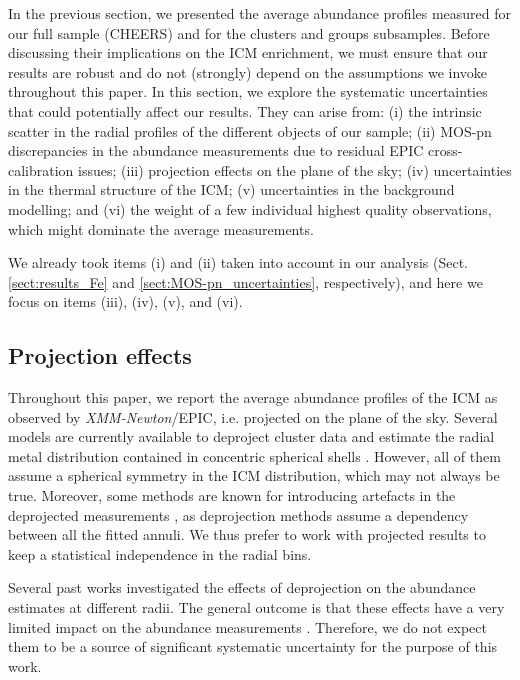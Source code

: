 \documentclass{aa}
\begin{document}
In the previous section, we presented the average abundance profiles measured for our full sample (CHEERS) and for the clusters and groups subsamples. Before discussing their implications on the ICM enrichment, we must ensure that our results are robust and do not (strongly) depend on the assumptions we invoke throughout this paper.
In this section, we explore the systematic uncertainties that could potentially affect our results. They can arise from: (i) the intrinsic scatter in the radial profiles of the different objects of our sample; (ii) MOS-pn discrepancies in the abundance measurements due to residual EPIC cross-calibration issues; (iii) projection effects on the plane of the sky; (iv) uncertainties in the thermal structure of the ICM; (v) uncertainties in the background modelling; and (vi) the weight of a few individual highest quality observations, which might dominate the average measurements.

We already took items (i) and (ii) taken into account in our analysis (Sect. \ref{sect:results_Fe} and \ref{sect:MOS-pn_uncertainties}, respectively), and here we focus on items (iii), (iv), (v), and (vi).









\subsection{Projection effects}\label{sect:systematics_proj}


Throughout this paper, we report the average abundance profiles of the ICM as observed by \textit{XMM-Newton}/EPIC, i.e. projected on the plane of the sky. Several models are currently available to deproject cluster data and estimate the radial metal distribution contained in concentric spherical shells \citep[e.g.][]{2003ApJ...590..225C,2004A&A...413..415K,2005MNRAS.356..237J,2008MNRAS.390.1207R}. However, all of them assume a spherical symmetry in the ICM distribution, which may not always be true. Moreover, some methods are known for introducing artefacts in the deprojected measurements \citep[for a comparison, see][]{2008MNRAS.390.1207R}, as deprojection methods assume a dependency between all the fitted annuli. We thus prefer to work with projected results to keep a statistical independence in the radial bins.

Several past works investigated the effects of deprojection on the abundance estimates at different radii. The general outcome is that these effects have a very limited impact on the abundance measurements \citep[e.g.][]{2007MNRAS.380.1554R,2008MNRAS.390.1207R}. Therefore, we do not expect them to be a source of significant systematic uncertainty for the purpose of this work.
\end{document}
